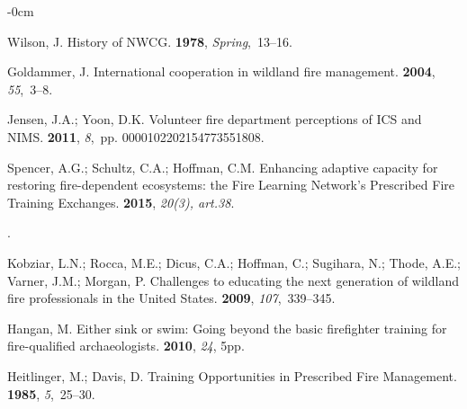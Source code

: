 \documentclass[fire,casereport,accept,moreauthors,pdftex]{Definitions/mdpi}  %
\begin{document}
\begin{adjustwidth}{-\extralength}{0cm}
\begin{thebibliography}{999}
Wilson, J.
\newblock History of NWCG.
 {\bf 1978}, {\em {Spring}},~13--16. %

Goldammer, J.
\newblock International cooperation in wildland fire management.
 {\bf 2004}, {\em 55},~3--8.

Jensen, J.A.; Yoon, D.K.
\newblock Volunteer fire department perceptions of ICS and NIMS.
 {\bf
  2011}, {\em {8}},~pp. 0000102202154773551808. %

Spencer, A.G.; Schultz, C.A.; Hoffman, C.M.
\newblock Enhancing adaptive capacity for restoring fire-dependent ecosystems:
  the Fire Learning Network’s Prescribed Fire Training Exchanges.
 {\bf 2015}, {\em {20(3), art.38}}.

. %

Kobziar, L.N.; Rocca, M.E.; Dicus, C.A.; Hoffman, C.; Sugihara, N.; Thode,
  A.E.; Varner, J.M.; Morgan, P.
\newblock Challenges to educating the next generation of wildland fire
  professionals in the United States.
 {\bf 2009}, {\em 107},~339--345.

Hangan, M.
\newblock Either sink or swim: Going beyond the basic firefighter training for
  fire-qualified archaeologists.
 {\bf
  2010}, {\em 24}, 5pp.

Heitlinger, M.; Davis, D.
\newblock Training Opportunities in Prescribed Fire Management.
 {\bf 1985}, {\em 5},~25--30.


\end{thebibliography}
\end{adjustwidth}
\end{document}
